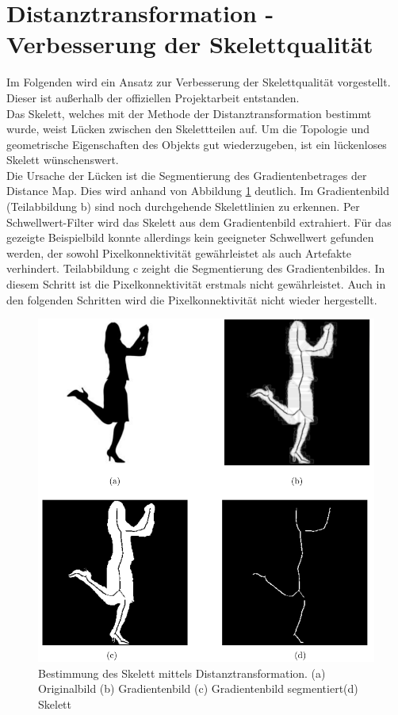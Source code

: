 \section{Distanztransformation - Verbesserung der Skelettqualität}
\label{sec:verbesserung}
Im Folgenden wird ein Ansatz zur Verbesserung der Skelettqualität
vorgestellt. Dieser ist außerhalb der offiziellen Projektarbeit
entstanden. \\
Das Skelett, welches mit der Methode der Distanztransformation bestimmt wurde, weist Lücken zwischen den Skelettteilen auf. Um die Topologie und geometrische Eigenschaften des Objekts gut wiederzugeben, ist ein lückenloses Skelett wünschenswert. \\
Die Ursache der Lücken ist die Segmentierung des Gradientenbetrages der Distance Map. Dies wird anhand von Abbildung \ref{fig:person-skelett} deutlich. Im Gradientenbild (Teilabbildung b) sind noch durchgehende Skelettlinien zu erkennen. Per Schwellwert-Filter wird das Skelett aus dem Gradientenbild extrahiert. Für das gezeigte Beispielbild konnte allerdings kein geeigneter Schwellwert gefunden werden, der sowohl Pixelkonnektivität gewährleistet als auch Artefakte verhindert. Teilabbildung c zeight die Segmentierung des Gradientenbildes. In diesem Schritt ist die Pixelkonnektivität erstmals nicht gewährleistet. Auch in den folgenden Schritten wird die Pixelkonnektivität nicht wieder hergestellt. 
\begin{figure}[htbp]
\centering
\includegraphics[width=1.0\linewidth]{./fig/person_gradienten_problem.pdf}
\caption{Bestimmung des Skelett mittels Distanztransformation. (a) Originalbild (b) Gradientenbild (c) Gradientenbild segmentiert(d) Skelett}
\label{fig:person-skelett}
\end{figure}\\
